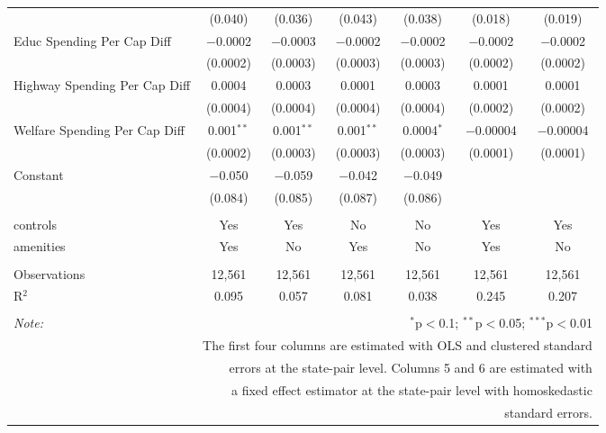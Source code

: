 \begin{table}[!htbp]
\begin{tabular}{@{\extracolsep{5pt}}lcccccc}
  & (0.040) & (0.036) & (0.043) & (0.038) & (0.018) & (0.019) \\ 
  Educ Spending Per Cap Diff & $-$0.0002 & $-$0.0003 & $-$0.0002 & $-$0.0002 & $-$0.0002 & $-$0.0002 \\ 
  & (0.0002) & (0.0003) & (0.0003) & (0.0003) & (0.0002) & (0.0002) \\ 
  Highway Spending Per Cap Diff & 0.0004 & 0.0003 & 0.0001 & 0.0003 & 0.0001 & 0.0001 \\ 
  & (0.0004) & (0.0004) & (0.0004) & (0.0004) & (0.0002) & (0.0002) \\ 
  Welfare Spending Per Cap Diff & 0.001$^{**}$ & 0.001$^{**}$ & 0.001$^{**}$ & 0.0004$^{*}$ & $-$0.00004 & $-$0.00004 \\ 
  & (0.0002) & (0.0003) & (0.0003) & (0.0003) & (0.0001) & (0.0001) \\ 
  Constant & $-$0.050 & $-$0.059 & $-$0.042 & $-$0.049 &  &  \\ 
  & (0.084) & (0.085) & (0.087) & (0.086) &  &  \\ 
 \hline \\[-1.8ex] 
controls & Yes & Yes & No & No & Yes & Yes \\ 
amenities & Yes & No & Yes & No & Yes & No \\ 
\hline \\[-1.8ex] 
Observations & 12,561 & 12,561 & 12,561 & 12,561 & 12,561 & 12,561 \\ 
R$^{2}$ & 0.095 & 0.057 & 0.081 & 0.038 & 0.245 & 0.207 \\ 
\hline 
\hline \\[-1.8ex] 
\textit{Note:}  & \multicolumn{6}{r}{$^{*}$p$<$0.1; $^{**}$p$<$0.05; $^{***}$p$<$0.01} \\ 
 & \multicolumn{6}{r}{The first four columns are estimated with OLS and clustered standard} \\ 
 & \multicolumn{6}{r}{ errors at the state-pair level. Columns 5 and 6 are estimated with} \\ 
 & \multicolumn{6}{r}{a fixed effect estimator at the state-pair level with homoskedastic} \\ 
 & \multicolumn{6}{r}{standard errors.} \\ 
\end{tabular} 
\end{table} 
